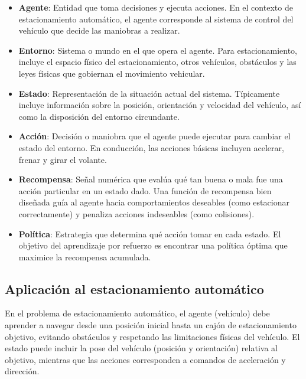 \begin{itemize}
    \item \textbf{Agente}: Entidad que toma decisiones y ejecuta acciones. En el contexto de estacionamiento automático,
    el agente corresponde al sistema de control del vehículo que decide las maniobras a realizar.
    
    \item \textbf{Entorno}: Sistema o mundo en el que opera el agente. Para estacionamiento, incluye
    el espacio físico del estacionamiento, otros vehículos, obstáculos y las leyes físicas que gobiernan
    el movimiento vehicular.
    
    \item \textbf{Estado}: Representación de la situación actual del sistema. Típicamente incluye
    información sobre la posición, orientación y velocidad del vehículo, así como la disposición
    del entorno circundante.
    
    \item \textbf{Acción}: Decisión o maniobra que el agente puede ejecutar para cambiar el estado
    del entorno. En conducción, las acciones básicas incluyen acelerar, frenar y girar el volante.
    
    \item \textbf{Recompensa}: Señal numérica que evalúa qué tan buena o mala fue una acción particular
    en un estado dado. Una función de recompensa bien diseñada guía al agente hacia comportamientos deseables
    (como estacionar correctamente) y penaliza acciones indeseables (como colisiones).
    
    \item \textbf{Política}: Estrategia que determina qué acción tomar en cada estado. El objetivo
    del aprendizaje por refuerzo es encontrar una política óptima que maximice la recompensa acumulada.
\end{itemize}

\subsection{Aplicación al estacionamiento automático}\label{subsec:rl-parking}

En el problema de estacionamiento automático, el agente (vehículo) debe aprender a navegar desde
una posición inicial hasta un cajón de estacionamiento objetivo, evitando obstáculos y respetando
las limitaciones físicas del vehículo. El estado puede incluir la pose del vehículo (posición y orientación)
relativa al objetivo, mientras que las acciones corresponden a comandos de aceleración y dirección.


